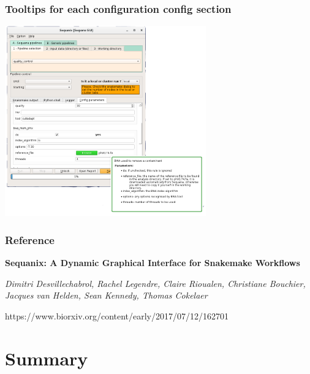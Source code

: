 \documentclass{beamer}
\begin{document}
\begin{frame}
\frametitle{Tooltips for each configuration config section}
\centering
\includegraphics[height=0.8\textheight, width=0.65\textwidth]{./images/dialog_tooltip.png}
\end{frame}



\begin{frame}
\frametitle{Reference} 
 
\textbf{Sequanix: A Dynamic Graphical Interface for Snakemake Workflows} 

\vspace{.5cm}

\textit{Dimitri Desvillechabrol, Rachel Legendre, Claire Rioualen, Christiane 
Bouchier, Jacques van Helden, Sean Kennedy, Thomas Cokelaer}

\vspace{.5cm}
 
https://www.biorxiv.org/content/early/2017/07/12/162701
 
\end{frame}



\section{Summary}
\end{document}
